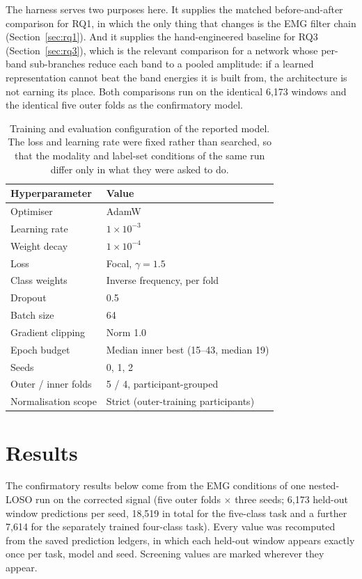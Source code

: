 \documentclass[pdflatex,sn-nature,iicol]{sn-jnl}
\begin{document}
The harness serves two purposes here. It supplies the matched before-and-after comparison for RQ1, in which the only thing that changes is the EMG filter chain (Section~\ref{sec:rq1}). And it supplies the hand-engineered baseline for RQ3 (Section~\ref{sec:rq3}), which is the relevant comparison for a network whose per-band sub-branches reduce each band to a pooled amplitude: if a learned representation cannot beat the band energies it is built from, the architecture is not earning its place. Both comparisons run on the identical 6,173 windows and the identical five outer folds as the confirmatory model.

\begin{table}[h]
  \caption{Training and evaluation configuration of the reported model. The loss and learning rate were fixed rather than searched, so that the modality and label-set conditions of the same run differ only in what they were asked to do.}
  \label{tab:hyperparameters}
  \centering
  \footnotesize
  \begin{tabular*}{\columnwidth}{@{\extracolsep{\fill}}ll@{}}
    \toprule
    Hyperparameter & Value \\
    \midrule
    Optimiser & AdamW \\
    Learning rate & $1\times10^{-3}$ \\
    Weight decay & $1\times10^{-4}$ \\
    Loss & Focal, $\gamma = 1.5$ \\
    Class weights & Inverse frequency, per fold \\
    Dropout & 0.5 \\
    Batch size & 64 \\
    Gradient clipping & Norm 1.0 \\
    Epoch budget & Median inner best (15--43, median 19) \\
    Seeds & 0, 1, 2 \\
    Outer / inner folds & 5 / 4, participant-grouped \\
    Normalisation scope & Strict (outer-training participants) \\
    \bottomrule
  \end{tabular*}
\end{table}

\section{Results}

The confirmatory results below come from the EMG conditions of one nested-LOSO run on the corrected signal (five outer folds $\times$ three seeds; 6,173 held-out window predictions per seed, 18,519 in total for the five-class task and a further 7,614 for the separately trained four-class task). Every value was recomputed from the saved prediction ledgers, in which each held-out window appears exactly once per task, model and seed. Screening values are marked wherever they appear.
\end{document}
